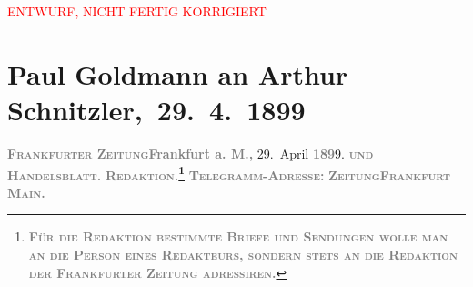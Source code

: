 
\begin{center}
            \textcolor{red}{ENTWURF, NICHT FERTIG KORRIGIERT}
                      \end{center}
            
         
         \newcommand{\erwaehntePersonen}{Personen: Alfred Dreyfus, Fedor Mamroth, Josef Rosengart, Vally Rosengart}
         \newcommand{\erwaehnteInstitutionen}{Institutionen: Frankfurter Zeitung}
         \newcommand{\erwaehnteOrte}{Orte: Berlin, Deutsches Theater Berlin, Frankfurt am Main, Wien}
         \newcommand{\erwaehnteWerke}{Werke: Der grüne Kakadu – Paracelsus – Die Gefährtin. Drei Einakter}
               \section[ Paul Goldmann an Arthur Schnitzler, 29. 4. 1899]{ Paul Goldmann an Arthur Schnitzler, 29. 4. 1899}\nopagebreak{}\rehead{ }\begin{ledgroupsized}[t]{13cm}\normalsize\beginnumbering \toendnotes[C]{\smallbreak\pagebreak[2]} 
\toendnotes[C]{\smallbreak}\pstart
           \noindent{}{\pb}\textcolor{gray}{\textbf{\textsc{Frankfurter Zeitung}}}\hfill \textcolor{gray}{\textbf{Frankfurt a. M.,}}{ }29. April \textcolor{gray}{\textbf{189}}9.\pend
           \pstart
           \textsc{\textcolor{gray}{\textbf{und}}}\pend
           \pstart
           \textcolor{gray}{\textbf{\textsc{Handelsblatt.}}}\pend
           \pstart
           \textcolor{gray}{\textbf{\textsc{Redaktion.\footnote{\noindent{}\textcolor{gray}{\textbf{\textsc{Für die Redaktion beſtimmte Briefe und Sendungen
                                    wolle man  an die Perſon eines
                                    Redakteurs, ſondern ſtets \textbf{an die Redaktion der
                                          Frankfurter Zeitung} adreſſiren.}}}}}}}\pend
           \pstart
           \textcolor{gray}{\textbf{\textsc{Telegramm-Adreſſe:}}}\pend
           \pstart
           \textcolor{gray}{\textbf{\textsc{ZeitungFrankfurt Main.}}}\pend

\end{ledgroupsized}
